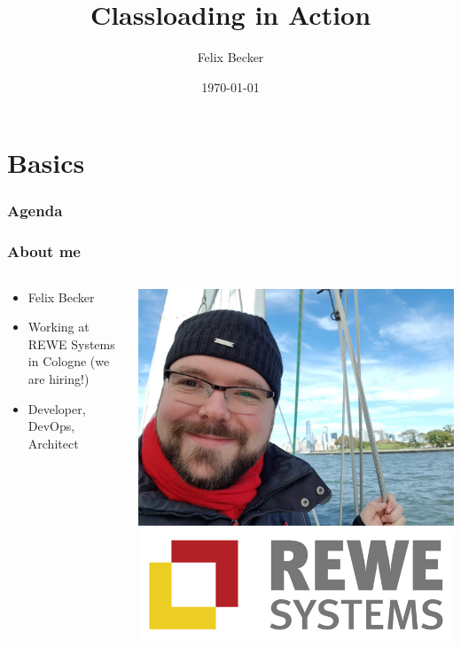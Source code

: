\documentclass[aspectratio=169]{beamer}
\title{Classloading in Action}
\author{Felix Becker}
\date{\today}
\institute{JAX 2019}
\begin{document}
\maketitle

\section{Basics}

\begin{frame}
	\frametitle{Agenda}
	\tableofcontents
\end{frame}

\begin{frame}
	\frametitle{About me}

\begin{columns}
    \begin{column}{0.68\textwidth}
		\begin{itemize}
		\item{Felix Becker}
		\item{Working at REWE Systems in Cologne (we are hiring!)}
		\item{Developer, DevOps, Architect}
		\end{itemize}
    \end{column}
    \begin{column}{0.28\textwidth}
		\includegraphics[scale=0.03]{assets/profilfoto-freizeit.jpg}
\\
\bigskip
		\includegraphics[scale=0.15]{assets/rewesyslogo.jpg}
    \end{column}
\end{columns}
\end{frame}
\end{document}
